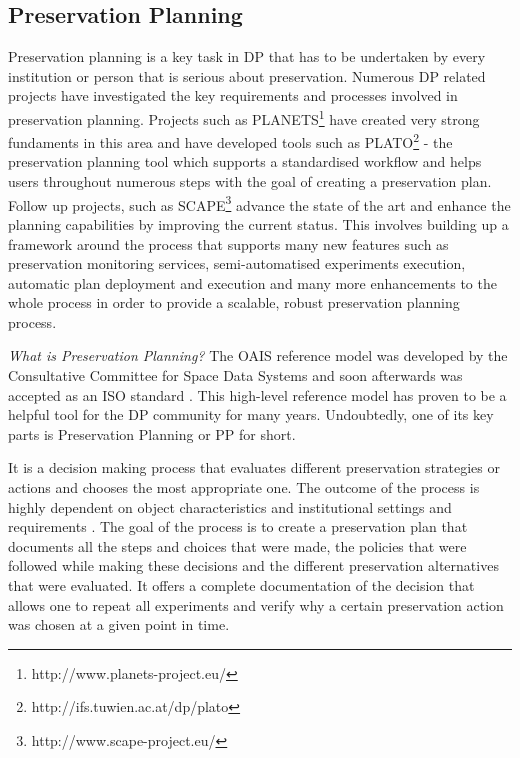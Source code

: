 \subsection{Preservation Planning}
Preservation planning is a key task in DP that has to be undertaken by every institution or person that is serious about preservation. Numerous DP related projects have investigated the key requirements and processes involved in preservation planning. Projects such as PLANETS\footnote{http://www.planets-project.eu/} have created very strong fundaments in this area and have developed tools such as PLATO\footnote{http://ifs.tuwien.ac.at/dp/plato} - the preservation planning tool which supports a standardised workflow and helps users throughout numerous steps with the goal of creating a preservation plan. Follow up projects, such as SCAPE\footnote{http://www.scape-project.eu/} advance the state of the art and enhance the planning capabilities by improving the current status. This involves building up a framework around the process that supports many new features such as preservation monitoring services, semi-automatised experiments execution, automatic plan deployment and execution and many more enhancements to the whole process in order to provide a scalable, robust preservation planning process.\newline

\noindent\textit{What is Preservation Planning?}\newline
The OAIS reference model was developed by the Consultative Committee for Space Data Systems and soon afterwards was accepted as an ISO standard \cite{iso:2003:oais}. This high-level reference model has proven to be a helpful tool for the DP community for many years. Undoubtedly, one of its key parts is Preservation Planning or PP for short.

It is a decision making process that evaluates different preservation strategies or actions and chooses the most appropriate one. The outcome of the process is highly dependent on object characteristics and institutional settings and requirements \cite{STR07_jcdl}. The goal of the process is to create a preservation plan that documents all the steps and choices that were made, the policies that were followed while making these decisions and the different preservation alternatives that were evaluated. It offers a complete documentation of the decision that allows one to repeat all experiments and verify why a certain preservation action was chosen at a given point in time.

